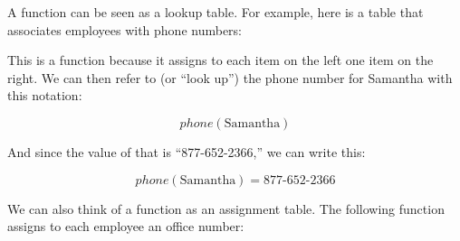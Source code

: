 \documentclass[../../../main.tex]{subfiles}
\begin{document}
A function can be seen as a lookup table. For example, here is a table that associates employees with phone numbers:

\begin{center}\end{center}

\noindent
This is a function because it assigns to each item on the left one item on the right. We can then refer to (or ``look up'') the phone number for Samantha with this notation:

\begin{equation}
  phone(\text{Samantha})
\end{equation}

\noindent
And since the value of that is ``877-652-2366,'' we can write this:

\begin{equation}
  phone(\text{Samantha}) = \text{877-652-2366}
\end{equation}

\noindent
We can also think of a function as an assignment table. The following function assigns to each employee an office number:

\begin{center}\end{center}
\end{document}
